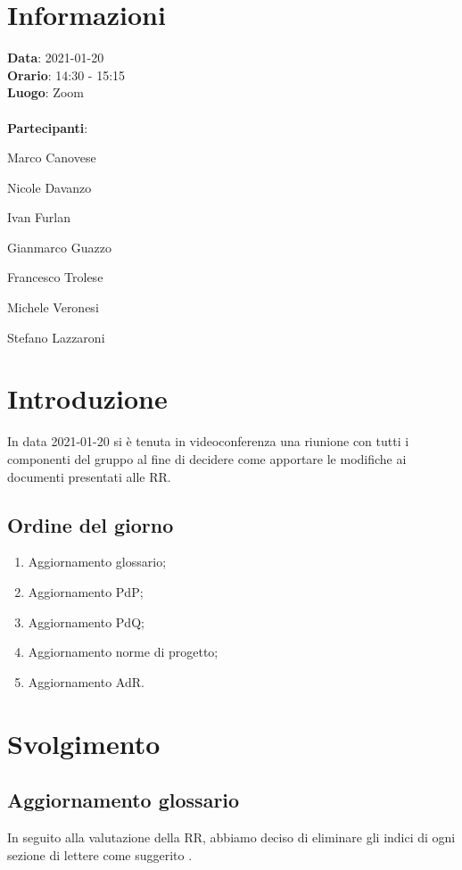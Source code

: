 \section{Informazioni}
\textbf{Data}: 2021-01-20\\
\textbf{Orario}: 14:30 - 15:15\\
\textbf{Luogo}: Zoom\\\\
\textbf{Partecipanti}:\begin{list}{*}{\setlength{\itemsep}{0cm}}
	\item Marco Canovese
	\item Nicole Davanzo
	\item Ivan Furlan
	\item Gianmarco Guazzo
	\item Francesco Trolese
	\item Michele Veronesi
	\item Stefano Lazzaroni
\end{list}

\section{Introduzione}
In data 2021-01-20 si è tenuta in videoconferenza una riunione con tutti i componenti del gruppo al fine di decidere come apportare le modifiche ai documenti presentati alle RR.

\subsection{Ordine del giorno}
\begin{enumerate}
    \item Aggiornamento glossario;
    \item Aggiornamento PdP;
    \item Aggiornamento PdQ;
    \item Aggiornamento norme di progetto;
    \item Aggiornamento AdR.
\end{enumerate}

\section{Svolgimento}
\subsection{Aggiornamento glossario}
In seguito alla valutazione della RR, abbiamo deciso di eliminare gli indici di ogni sezione di lettere come suggerito .

